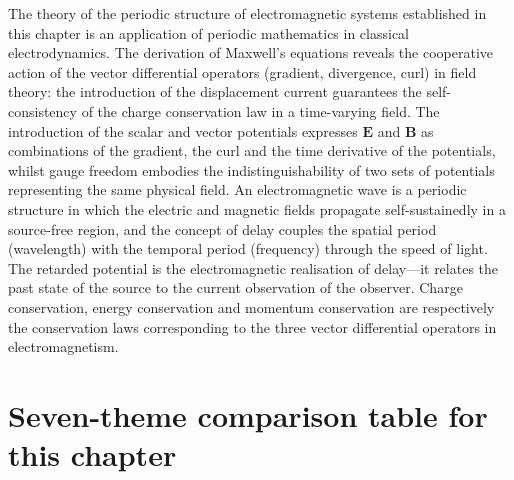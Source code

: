 \begin{remark}
The theory of the periodic structure of electromagnetic systems established in this chapter is an application of periodic mathematics in classical electrodynamics. The derivation of Maxwell's equations reveals the cooperative action of the vector differential operators (gradient, divergence, curl) in field theory: the introduction of the displacement current guarantees the self-consistency of the charge conservation law in a time-varying field. The introduction of the scalar and vector potentials expresses $\mathbf{E}$ and $\mathbf{B}$ as combinations of the gradient, the curl and the time derivative of the potentials, whilst gauge freedom embodies the indistinguishability of two sets of potentials representing the same physical field. An electromagnetic wave is a periodic structure in which the electric and magnetic fields propagate self-sustainedly in a source-free region, and the concept of delay couples the spatial period (wavelength) with the temporal period (frequency) through the speed of light. The retarded potential is the electromagnetic realisation of delay---it relates the past state of the source to the current observation of the observer. Charge conservation, energy conservation and momentum conservation are respectively the conservation laws corresponding to the three vector differential operators in electromagnetism.
\end{remark}

\section*{Seven-theme comparison table for this chapter}

